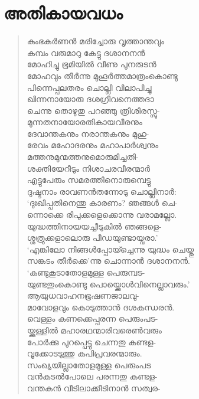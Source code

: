 
\section{അതികായവധം}

\begin{verse}
കുംഭകര്‍ണന്‍ മരിച്ചോരു വൃത്താന്തവും\\
കമ്പം വരുമാറു കേട്ടു ദശാനനന്‍\\
മോഹിച്ചു ഭൂമിയില്‍ വീണു പുനരുടന്‍\\
മോഹവും തീര്‍ന്നു മുഹൂര്‍ത്തമാത്രംകൊണ്ടു\\
പിന്നെപ്പലതരം ചൊല്ലി വിലാപിച്ചു\\
ഖിന്നനായോരു ദശഗ്രീവനെത്തദാ\\
ചെന്നു തൊഴുതു പറഞ്ഞു ത്രിശിരസ്സു-\\
മുന്നതനായോരതികായവീരനും\\
ദേവാന്തകനും നരാന്തകനും മുഹു-\\
രേവം മഹോദരനും മഹാപാര്‍ശ്വനും\\
മത്തനുമുന്മത്തനുമൊരുമിച്ചതി-\\
ശക്തിയേറീടും നിശാചരവീരന്മാര്‍\\
എട്ടുപേരും സമരത്തിനൊരുമ്പെട്ടു\\
ദുഷ്ടനാം രാവണന്‍തന്നോടു ചൊല്ലിനാര്‍:\\
‘ദുഃഖിപ്പതിനെന്തു കാരണം? ഞങ്ങള്‍ ചെ-\\
ന്നൊക്കെ രിപുക്കളെക്കൊന്നു വരാമല്ലോ.\\
യുദ്ധത്തിനായയച്ചീടുകില്‍ ഞങ്ങളെ-\\
ശ്ശത്രുക്കളാലൊരു പീഡയുണ്ടായ്വരാ.’\\
‘എങ്കിലോ നിങ്ങള്‍പ്പോയ്ച്ചെന്നു യുദ്ധം ചെയ്തു\\
സങ്ക‍ടം തീര്‍ക്കെ’ന്നു ചൊന്നാന്‍ ദശാനനന്‍.\\
‘കണ്ടുകൂടാതോളമുള്ള പെരുമ്പട-\\
യുണ്ടതുംകൊണ്ടു പൊയ്ക്കൊള്‍വിനെല്ലാവരും.’\\
ആയുധവാഹനഭൂഷണജാലവു-\\
മാവോളവും കൊടുത്താന്‍ ദശകന്ധരന്‍.\\
വെള്ളം കണക്കെപ്പരന്ന പെരുംപട-\\
യ്ക്കുള്ളില്‍ മഹാരഥന്മാരിവരെണ്‍വരും\\
പോര്‍ക്കു പുറപ്പെട്ടു ചെന്നതു കണ്ടള-\\
വൂക്കോടടുത്തു കപിപ്രവരന്മാരും.\\
സംഖ്യയില്ലാതോളമുള്ള പെരുംപട\\
വന്‍കടല്‍പോലെ പരന്നതു കണ്ടള-\\
വന്തകന്‍ വീടിലാക്കീടിനാന്‍ സത്വര-\\

\end{verse}
